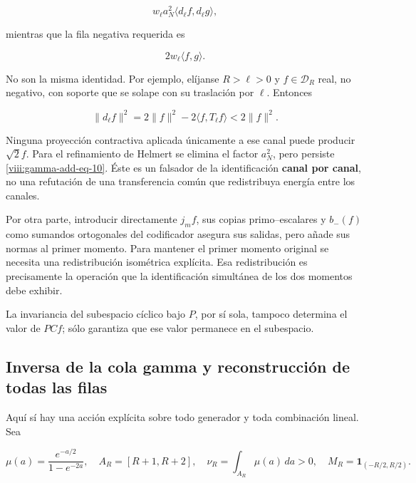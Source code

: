 \begin{equation}
w_\ell a_N^2\langle d_\ell f,d_\ell g\rangle,
\label{viii:gamma-add-display-22}
\end{equation}

mientras que la fila negativa requerida es

\begin{equation}
2w_\ell\langle f,g\rangle.
\label{viii:gamma-add-display-23}
\end{equation}

No son la misma identidad. Por ejemplo, elíjanse \(R>\ell>0\) y \(f\in\mathcal D_R\) real, no negativo, con soporte que se solape con su traslación por \(\ell\). Entonces

\begin{equation}
\|d_\ell f\|^2
=2\|f\|^2-2\langle f,T_\ell f\rangle
<2\|f\|^2.
\label{viii:gamma-add-eq-10}
\end{equation}

Ninguna proyección contractiva aplicada únicamente a ese canal puede producir \(\sqrt2f\). Para el refinamiento de Helmert se elimina el factor \(a_N^2\), pero persiste \eqref{viii:gamma-add-eq-10}. Éste es un falsador de la identificación \textbf{canal por canal}, no una refutación de una transferencia común que redistribuya energía entre los canales.

Por otra parte, introducir directamente \(j_mf\), sus copias primo--escalares y \(b_-(f)\) como sumandos ortogonales del codificador asegura sus salidas, pero añade sus normas al primer momento. Para mantener el primer momento original se necesita una redistribución isométrica explícita. Esa redistribución es precisamente la operación que la identificación simultánea de los dos momentos debe exhibir.

La invariancia del subespacio cíclico bajo \(P\), por sí sola, tampoco determina el valor de \(PCf\); sólo garantiza que ese valor permanece en el subespacio.

\subsection{Inversa de la cola gamma y reconstrucción de todas las filas}
\label{viii:gamma-add-sub-288}

Aquí sí hay una acción explícita sobre todo generador y toda combinación lineal. Sea

\begin{equation}
\mu(a)=\frac{e^{-a/2}}{1-e^{-2a}},\quad
A_R=[R+1,R+2],\quad \nu_R=\int_{A_R}\mu(a)\,da>0,
\quad M_R=\mathbf1_{(-R/2,R/2)}.
\label{viii:gamma-add-display-25}
\end{equation}

